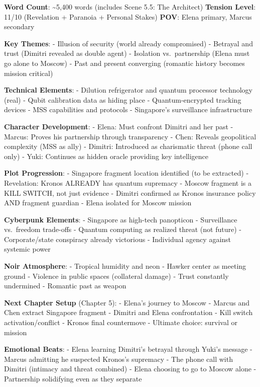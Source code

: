 \textbf{Word Count}: \textasciitilde5,400 words (includes Scene 5.5: The Architect) \textbf{Tension Level}: 11/10 (Revelation + Paranoia + Personal Stakes) \textbf{POV}: Elena primary, Marcus secondary

\textbf{Key Themes}: - Illusion of security (world already compromised) - Betrayal and trust (Dimitri revealed as double agent) - Isolation vs.~partnership (Elena must go alone to Moscow) - Past and present converging (romantic history becomes mission critical)

\textbf{Technical Elements}: - Dilution refrigerator and quantum processor technology (real) - Qubit calibration data as hiding place - Quantum-encrypted tracking devices - MSS capabilities and protocols - Singapore's surveillance infrastructure

\textbf{Character Development}: - Elena: Must confront Dimitri and her past - Marcus: Proves his partnership through transparency - Chen: Reveals geopolitical complexity (MSS as ally) - Dimitri: Introduced as charismatic threat (phone call only) - Yuki: Continues as hidden oracle providing key intelligence

\textbf{Plot Progression}: - Singapore fragment location identified (to be extracted) - Revelation: Kronos ALREADY has quantum supremacy - Moscow fragment is a KILL SWITCH, not just evidence - Dimitri confirmed as Kronos insurance policy AND fragment guardian - Elena isolated for Moscow mission

\textbf{Cyberpunk Elements}: - Singapore as high-tech panopticon - Surveillance vs.~freedom trade-offs - Quantum computing as realized threat (not future) - Corporate/state conspiracy already victorious - Individual agency against systemic power

\textbf{Noir Atmosphere}: - Tropical humidity and neon - Hawker center as meeting ground - Violence in public spaces (collateral damage) - Trust constantly undermined - Romantic past as weapon

\textbf{Next Chapter Setup} (Chapter 5): - Elena's journey to Moscow - Marcus and Chen extract Singapore fragment - Dimitri and Elena confrontation - Kill switch activation/conflict - Kronos final countermove - Ultimate choice: survival or mission

\textbf{Emotional Beats}: - Elena learning Dimitri's betrayal through Yuki's message - Marcus admitting he suspected Kronos's supremacy - The phone call with Dimitri (intimacy and threat combined) - Elena choosing to go to Moscow alone - Partnership solidifying even as they separate
